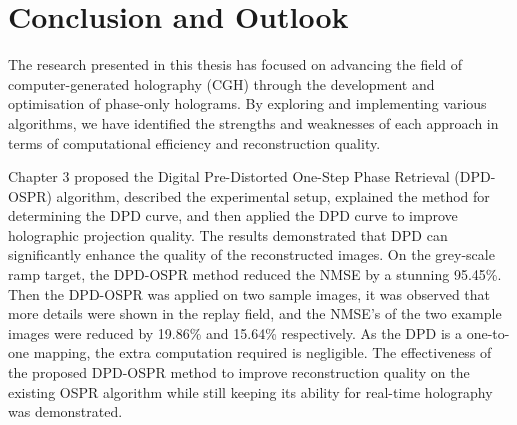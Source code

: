 
\chapter{Conclusion and Outlook}

The research presented in this thesis has focused on advancing the field of computer-generated holography (CGH) through the development and optimisation of phase-only holograms. By exploring and implementing various algorithms, we have identified the strengths and weaknesses of each approach in terms of computational efficiency and reconstruction quality.

Chapter 3 proposed the Digital Pre-Distorted One-Step Phase Retrieval (DPD-OSPR) algorithm, described the experimental setup, explained the method for determining the DPD curve, and then applied the DPD curve to improve holographic projection quality. The results demonstrated that DPD can significantly enhance the quality of the reconstructed images. On the grey-scale ramp target, the DPD-OSPR method reduced the NMSE by a stunning 95.45\%. Then the DPD-OSPR was applied on two sample images, it was observed that more details were shown in the replay field, and the NMSE's of the two example images were reduced by 19.86\% and 15.64\% respectively. As the DPD is a one-to-one mapping, the extra computation required is negligible. The effectiveness of the proposed DPD-OSPR method to improve reconstruction quality on the existing OSPR algorithm while still keeping its ability for real-time holography was demonstrated.

